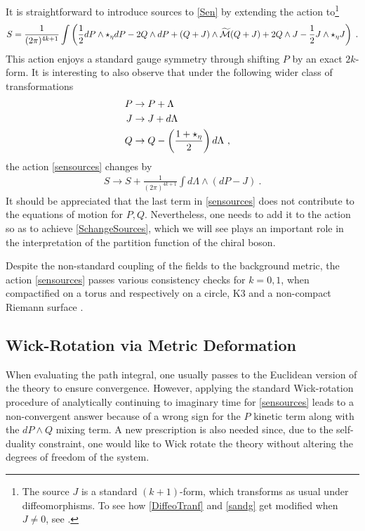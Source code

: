\documentclass[11pt]{article}
\numberwithin{equation}{section}
\begin{document}
It is straightforward to introduce sources to \eqref{Sen} by extending the action to\footnote{The source $J$ is a standard $(k+1)$-form, which transforms as usual under diffeomorphisms. To see how \eqref{DiffeoTranf} and \eqref{sandg} get modified when $J\not=0$, see \cite{Andriolo:2020ykk}.}
\begin{align}\label{sensources}
    S  =\frac{1}{(2\pi)^{4k+1}} \int \left(\frac12 d P\wedge\star_\eta d P -2Q\wedge d P +   (Q+J)\wedge \widetilde{ {\cal M}}(Q+J) + 2Q\wedge J-\frac12 J\wedge\star_{\eta} J \right)\;.
\end{align}
This action enjoys a standard gauge symmetry through shifting $P$ by an exact $2k$-form. It is interesting to also observe that under the following wider class of transformations 
\begin{align}\label{Lsym}
P &\to P+\Lambda \cr
J &\to J + d \Lambda \cr
Q &\to Q-\left(\frac{1+\star_{\eta}}{2}\right) d \Lambda\ ,
\end{align}
the action \eqref{sensources} 
changes by
\begin{align}\label{SchangeSources}
S\to S + \frac{1}{(2\pi)^{4k+1}}\int d\Lambda \wedge ( dP-J)\ .
\end{align}
It should be appreciated that the last term in \eqref{sensources} does not contribute to the equations of motion for $P, Q$. Nevertheless, one needs to add it to the action so as to achieve \eqref{SchangeSources}, which we will see  plays an important role in the interpretation of the partition function of the chiral boson.

Despite the non-standard coupling of the fields to the background metric, the action \eqref{sensources} passes various consistency checks for $k=0,1$, when compactified on a torus and respectively on a circle, K3 and a non-compact Riemann surface \cite{Sen:2019qit,Andriolo:2020ykk}.


\subsection{Wick-Rotation via Metric Deformation}
\label{sec:visser}

When evaluating the path integral, one usually passes to the Euclidean version of the theory to ensure convergence. However, applying the standard Wick-rotation procedure of analytically continuing to imaginary time for \eqref{sensources} leads to a non-convergent answer because of a wrong sign for the $P$ kinetic term along with the $dP\wedge Q$ mixing term. A new prescription is also needed since, due to the self-duality constraint, one would like to Wick rotate the theory without altering the degrees of freedom of the system.
\end{document}
